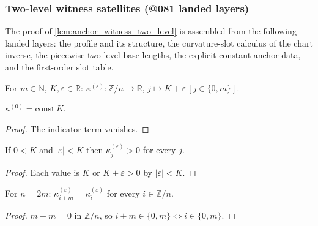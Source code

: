 \subsubsection*{Two-level witness satellites (@081 landed layers)}

The proof of \cref{lem:anchor_witness_two_level} is assembled from the
following landed layers: the profile and its structure, the curvature-slot
calculus of the chart inverse, the piecewise two-level base lengths, the
explicit constant-anchor data, and the first-order slot table.

\begin{definition}
  \label{def:two_level_profile}
  For $m \in \mathbb{N}$, $K, \varepsilon \in \mathbb{R}$:
  $\kappa^{(\varepsilon)} : \mathbb{Z}/n \to \mathbb{R}$,
  $j \mapsto K + \varepsilon\,[j \in \{0, m\}]$.
\end{definition}

\begin{lemma}\leanok
[two-level profile at $\varepsilon = 0$]
  \label{lem:two_level_profile_zero}
  $\kappa^{(0)} = \mathrm{const}\,K$.
\end{lemma}
\begin{proof}

\leanok
  The indicator term vanishes.
\end{proof}

\begin{lemma}
  \label{lem:two_level_profile_pos}
  If $0 < K$ and $|\varepsilon| < K$ then $\kappa^{(\varepsilon)}_j > 0$ for
  every $j$.
\end{lemma}
\begin{proof}

\leanok
  Each value is $K$ or $K + \varepsilon > 0$ by $|\varepsilon| < K$.
\end{proof}

\begin{lemma}
  \label{lem:two_level_profile_symm}
  For $n = 2m$: $\kappa^{(\varepsilon)}_{i+m} = \kappa^{(\varepsilon)}_i$ for
  every $i \in \mathbb{Z}/n$.
\end{lemma}
\begin{proof}

\leanok
  $m + m = 0$ in $\mathbb{Z}/n$, so $i + m \in \{0,m\} \iff i \in \{0,m\}$.
\end{proof}

